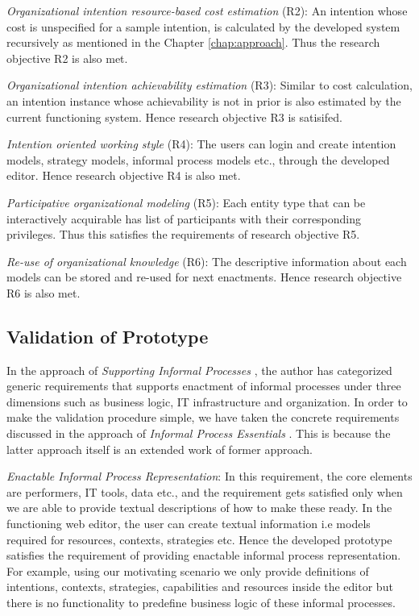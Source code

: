 \textit{Organizational intention resource-based cost estimation} (R2): An intention whose cost is unspecified for a sample intention, is calculated by the developed system recursively as mentioned in the Chapter \ref{chap:approach}. Thus the research objective R2 is also met.

\textit{Organizational intention achievability estimation} (R3): Similar to cost calculation, an intention instance whose achievability is not in prior is also estimated by the current functioning system. Hence research objective R3 is satisifed.

\textit{Intention oriented working style} (R4): The users can login and create intention models, strategy models, informal process models etc., through the developed editor. Hence research objective R4 is also met.

\textit{Participative organizational modeling} (R5): Each entity type that can be interactively acquirable has list of participants with their corresponding privileges. Thus this satisfies the requirements of research objective R5.

\textit{Re-use of organizational knowledge} (R6): The descriptive information about each models can be stored and re-used for next enactments. Hence research objective R6 is also met.
	
\subsection{Validation of Prototype}
\label{subsec:validationofprototype}
In the approach of \textit{Supporting Informal Processes} \cite{Sungur2014}, the author has categorized generic requirements that supports enactment of informal processes under three dimensions such as business logic, IT infrastructure and organization. In order to make the validation procedure simple, we have taken the concrete requirements discussed in the approach of \textit{Informal Process Essentials} \cite{Sungur2014a}. This is because the latter approach itself is an extended work of former approach.  

\textit{Enactable Informal Process Representation}: In this requirement, the core elements are performers, IT tools, data etc., and the requirement gets satisfied only when we are able to provide textual descriptions of how to make these ready. In the functioning web editor, the user can create textual information i.e models required for resources, contexts, strategies etc. Hence the developed prototype satisfies the requirement of providing enactable informal process representation. For example, using our motivating scenario we only provide definitions of intentions, contexts, strategies, capabilities and resources inside the editor but there is no functionality to  predefine business logic of these informal processes.

